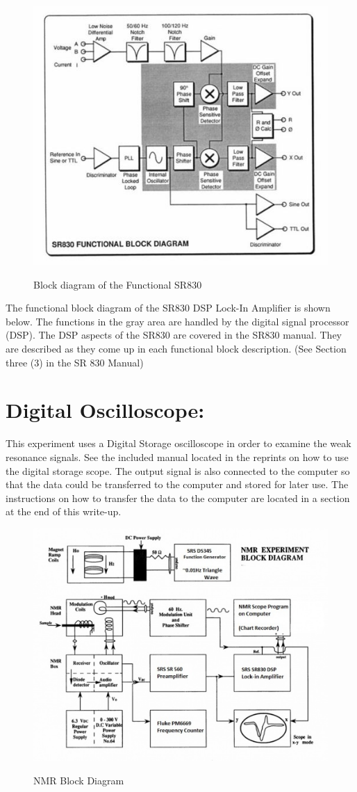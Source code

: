 \documentclass{../lab}
\begin{document}
\begin{figure}[h]
    \centering
    \href{http://experimentationlab.berkeley.edu/sites/default/files/images/500px-NMR34.jpg}{\includegraphics[width=0.5\linewidth]{images/500px-NMR34.jpg}}
    \caption{Block diagram of the Functional SR830}
    \label{fig:500px-NMR34}
\end{figure}

The functional block diagram of the SR830 DSP Lock-In Amplifier is shown below. The functions in the gray area are handled by the digital signal processor (DSP). The DSP aspects of the SR830 are covered in the SR830 manual. They are described as they come up in each functional block description. (See Section three (3) in the SR 830 Manual)

\section{Digital Oscilloscope:}

This experiment uses a Digital Storage oscilloscope in order to examine the weak resonance signals. See the included manual located in the reprints on how to use the digital storage scope. The output signal is also connected to the computer so that the data could be transferred to the computer and stored for later use. The instructions on how to transfer the data to the computer are located in a section at the end of this write-up.

\begin{figure}[h]
    \centering
    \href{http://experimentationlab.berkeley.edu/sites/default/files/images/500px-NMRblockdiagram.jpg}{\includegraphics[width=0.6\linewidth]{images/500px-NMRblockdiagram.jpg}}
    \caption{NMR Block Diagram}
    \label{fig:500px-NMRblockdiagram}
\end{figure}
\end{document}
